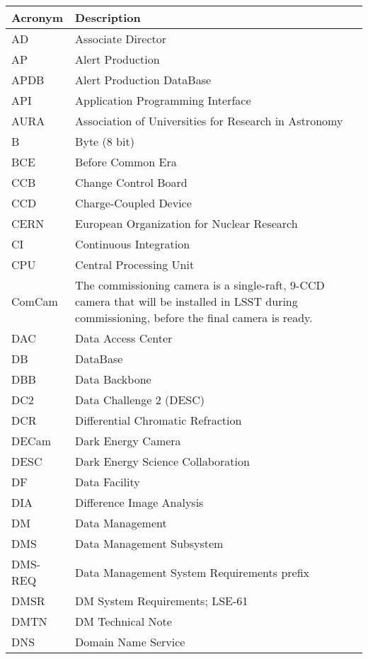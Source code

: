\addtocounter{table}{-1}
\begin{longtable}{p{}p{}}\hline
\textbf{Acronym} & \textbf{Description}  \\\hline

AD & Associate Director \\\hline
AP & Alert Production \\\hline
APDB & Alert Production DataBase \\\hline
API & Application Programming Interface \\\hline
AURA & Association of Universities for Research in Astronomy \\\hline
B & Byte (8 bit) \\\hline
BCE & Before Common Era \\\hline
CCB & Change Control Board \\\hline
CCD & Charge-Coupled Device \\\hline
CERN & European Organization for Nuclear Research \\\hline
CI & Continuous Integration \\\hline
CPU & Central Processing Unit \\\hline
ComCam & The commissioning camera is a single-raft, 9-CCD camera that will be installed in LSST during commissioning, before the final camera is ready. \\\hline
DAC & Data Access Center \\\hline
DB & DataBase \\\hline
DBB & Data Backbone \\\hline
DC2 & Data Challenge 2 (DESC) \\\hline
DCR & Differential Chromatic Refraction \\\hline
DECam & Dark Energy Camera \\\hline
DESC & Dark Energy Science Collaboration \\\hline
DF & Data Facility \\\hline
DIA & Difference Image Analysis \\\hline
DM & Data Management \\\hline
DMS & Data Management Subsystem \\\hline
DMS-REQ & Data Management System Requirements prefix \\\hline
DMSR & DM System Requirements; LSE-61 \\\hline
DMTN & DM Technical Note \\\hline
DNS & Domain Name Service \\\hline

\end{longtable}
